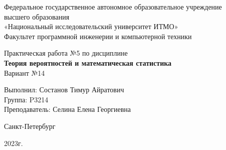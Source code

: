 \begin{center}
	{\large
	Федеральное государственное автономное образовательное учреждение\\
	высшего образования\\
	«Национальный исследовательский университет ИТМО»\\

	\vspace{5pt}
	Факультет программной инженерии и компьютерной техники\\
	}
	\vspace{17em}

	{\Large Практическая работа №5} \Large по дисциплине\\
	\smallskip
	{\LARGE \textbf{Теория вероятностей и
			математическая статистика}}\\[1em]
	{\large Вариант №14}


\end{center}

\vspace{20em}
{\large
\begin{flushright}
	Выполнил: Состанов Тимур Айратович\\
	Группа: P3214\\
	Преподаватель: Селина Елена Георгиевна\\
\end{flushright}

\vspace{\fill}

\begin{center}
	Санкт-Петербург

	2023г.
\end{center}
}